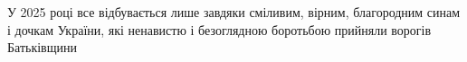 
\thispagestyle{empty}
\null\vspace{6cm}
\noindent{}

\vfill
\noindent\hspace{1.5cm}
\begin{minipage}{\linewidth-1.5cm}
\scmain
\raggedright
У 2025 році все відбувається лише завдяки\newline
сміливим, вірним, благородним синам і\newline
дочкам України, які ненавистю і безоглядною\newline
боротьбою прийняли ворогів Батьківщини
\end{minipage}

\clearpage


\thispagestyle{empty}
\null\vspace{0.5cm}
\noindent{}

\vspace{1.56cm}  %
\noindent{}

\vspace{0.1cm}
\noindent{}

\vspace{1.5cm}
\noindent{}

\smallskip
\noindent\htitlespace{\scmain \BookTitleDe{}}

\vspace{1.5cm}
\noindent\htitlespace{\AuflageDe}

\smallskip
\noindent\htitlespace{\AuflageDeSecond}

\vspace{0.5cm}
\noindent\htitlespace{\HerausgegebenDe}

\vfill
\noindent\htitlespace{\scmain \PublisherDe{} \bouillondot{} \CityDe{} \bouillondot{} \YearDe}
\clearpage

\thispagestyle{empty}
\null\vspace{0.5cm}
\noindent{}

\vspace{1.56cm}  %
\noindent{}

